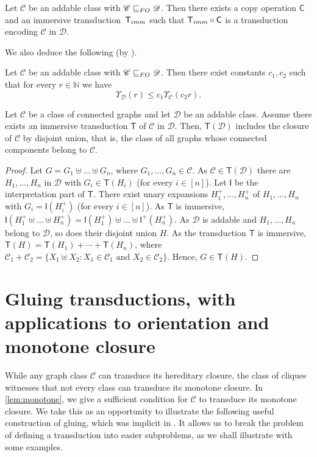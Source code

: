 \documentclass{lmcs}
\newcommand{\Cc}{\mathscr{C}}
\newcommand{\Dd}{\mathscr{D}}
\renewcommand{\FO}{{\rm FO}}
\theoremstyle{definition}
\DeclareMathOperator{\union}{\uplus}
\begin{document}
\begin{cor}\label{crl:slunion}
	Let $\Cc$ be an addable class with  $\Cc\sqsubseteq_\FO\Dd$.  Then there exists a copy operation $\mathsf C$ and an immersive transduction~$\mathsf T_{\rm imm}$ such that $\mathsf T_{\rm imm}\circ\mathsf C$ is a transduction encoding $\Cc$ in $\Dd$. 
\end{cor}
We also deduce the following (by ).
\begin{cor}\label{cor:dil_union}
	Let $\Cc$ be an addable class with  $\Cc\sqsubseteq_\FO\Dd$.  Then there exist constants $c_1,c_2$ such that for every $r\in\mathbb N$ we have
	\[
	\Upsilon_{\mathscr D}(r)\leq c_1\Upsilon_{\mathscr C}(c_2r).
	\]
\end{cor}


\begin{lem}
	\label{lem:imm_con}
	Let $\Cc$ be a class of connected graphs and let $\Dd$ be an addable class.
	Assume there exists an immersive transduction $\mathsf T$ of $\Cc$ in $\Dd$. Then, $\mathsf T(\Dd)$ includes the closure of $\Cc$ by disjoint union, that is, the class of all graphs whose connected components belong to $\Cc$.
\end{lem}
\begin{proof}
	Let $G=G_1\union\dots\union G_n$, where $G_1,\dots,G_n\in\Cc$. 
	As $\Cc\in\mathsf T(\Dd)$ there are $H_1,\dots,H_n$ in $\Dd$ with
	$G_i\in\mathsf T(H_i)$ (for every $i\in[n]$). Let $\mathsf I$ be the interpretation part of $\mathsf T$. There exist unary expansions $H_1^+,\dots,H_n^+$ of $H_1,\dots,H_n$ with $G_i=\mathsf I(H_i^+)$ 
	(for every $i\in[n]$).
	As $\mathsf T$ is immersive, $\mathsf I(H_1^+\union\dots\union H_n^+)=\mathsf I(H_1^+)\union\dots\union\mathsf I^+(H_n^+)$.  As $\Dd$ is addable and
	$H_1,\dots,H_n$ belong to $\Dd$,  so does their disjoint union $H$. As  the transduction $\mathsf T$ is immersive,  $\mathsf T(H)=\mathsf T(H_1)+\cdots+\mathsf T(H_n)$, where
	$\Cc_1+\Cc_2=\{X_1\union X_2\colon X_1\in\Cc_1\text{ and }X_2\in\Cc_2\}$.
	Hence,  $G\in\mathsf T(H)$.
\end{proof}

\section{Gluing transductions, with applications to orientation and monotone closure}
While any graph class $\Cc$ can transduce its hereditary closure, the class of cliques witnesses that not every class can transduce its monotone closure. In \cref{lem:monotone}, we give a sufficient condition for $\Cc$ to transduce its monotone closure. We take this as an opportunity to illustrate the following useful construction of gluing, which was implicit in \cite{shrubbery}. It allows us to break the problem of defining  a 
transduction into easier subproblems, as we shall illustrate with some examples.
\end{document}
